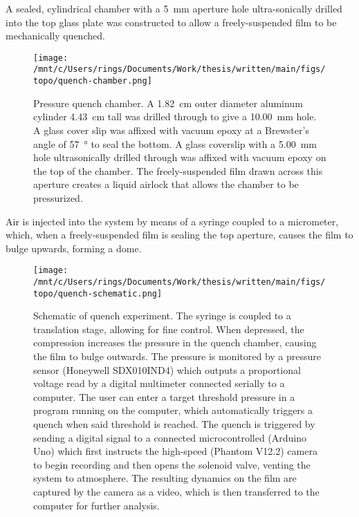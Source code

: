\documentclass[superscriptaddress,floatfix,draft,prl]{revtex4-1}
\begin{document}
A sealed, cylindrical chamber with a
\SI{5}{\milli\metre} aperture hole ultra-sonically drilled into the top glass
plate was constructed to allow a freely-suspended film to be mechanically
quenched. 
\begin{figure}[h!]
    \centering
    \texttt{[image: /mnt/c/Users/rings/Documents/Work/thesis/written/main/figs/topo/quench-chamber.png]}
    \caption[Schematic of quench chamber]{\label{fig:topo:quenchChamber}Pressure
        quench chamber. A
        \SI{1.82}{\centi\meter} outer diameter aluminum cylinder
        \SI{4.43}{\centi\meter} tall was drilled through to give a \SI{10.00}{\milli\meter} hole. A glass cover slip was affixed with vacuum epoxy at a
Brewster's angle of \SI{57}{\degree} to seal the bottom. A glass coverslip with
a \SI{5.00}{\milli\meter} hole ultrasonically drilled through was affixed with
vacuum epoxy on the top of the chamber. The freely-suspended film drawn
across this aperture creates a liquid airlock that allows the chamber to be
pressurized.}
\end{figure}
Air is injected into the system by means of a syringe coupled to a
micrometer, which, when a freely-suspended film is sealing the top aperture,
causes the film to bulge upwards, forming a dome.

\begin{figure}[h!]
    \centering
    \texttt{[image: /mnt/c/Users/rings/Documents/Work/thesis/written/main/figs/topo/quench-schematic.png]}
    \caption[Schematic of quench
    experiment.]{\label{fig:topo:quenchSchematic}Schematic of quench experiment.
    The syringe is coupled to a translation stage, allowing for fine control.
When depressed, the compression increases the pressure in the quench chamber,
causing the film to bulge outwards. The pressure is monitored by a pressure
sensor (Honeywell SDX010IND4) which outputs a proportional voltage read by a
digital multimeter connected serially to a computer. The user can enter a
target threshold pressure in a program running on the computer, which
automatically triggers a quench when said threshold is reached. The quench is
triggered by sending a digital signal to a connected microcontrolled (Arduino
Uno) which first instructs the high-speed (Phantom V12.2) camera to begin
recording and then opens the solenoid valve, venting the system to atmosphere.
The resulting dynamics on the film are captured by the camera as a video, which
is then transferred to the computer for further analysis.}
\end{figure}
\end{document}
